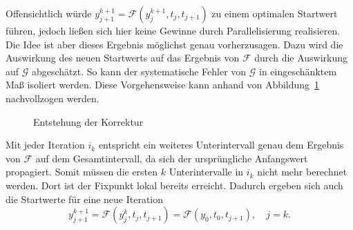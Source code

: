 Offensichtlich würde \(y_{j+1}^{k+1} = \mathcal{F}\!\!\left(y_j^{k+1}, t_j, t_{j+1}\right)\) zu einem optimalen Startwert führen, jedoch ließen sich hier keine Gewinne durch Parallelisierung realisieren. Die Idee ist aber dieses Ergebnis möglichst genau vorherzusagen. Dazu wird die Auswirkung des neuen Startwerts auf das Ergebnis von \(\mathcal{F}\) durch die Auswirkung auf \(\mathcal{G}\) abgeschätzt. So kann der systematische Fehler von \(\mathcal{G}\) in eingeschänktem Maß isoliert werden. Diese Vorgehensweise kann anhand von Abbildung~\ref{fig:merge} nachvollzogen werden.
\begin{figure}[ht]
    \centering
        \begin{tikzpicture}[scale=2.2]
            
        \end{tikzpicture}
    \caption{Entstehung der Korrektur}
    \label{fig:merge}
\end{figure}
Mit jeder Iteration \(i_k\) entspricht ein weiteres Unterintervall genau dem Ergebnis von \(\mathcal{F}\) auf dem Gesamtintervall, da sich der ursprüngliche Anfangswert propagiert. Somit müssen die ersten \(k\) Unterintervalle in \(i_k\) nicht mehr berechnet werden. Dort ist der Fixpunkt lokal bereits erreicht. Dadurch ergeben sich auch die Startwerte für eine neue Iteration
\begin{displaymath}
    y_{j+1}^{k+1} = \mathcal{F}\!\!\left(y_{j}^{k}, t_j, t_{j+1}\right) = \mathcal{F}\!\!\left(y_0, t_0, t_{j+1}\right), \quad j = k.
\end{displaymath}

